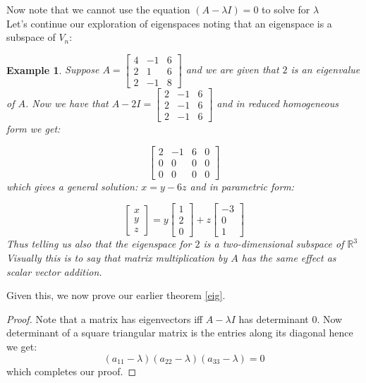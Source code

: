 \documentclass[titlepage]{article}
\newtheorem{exm}{Example}[subsection]
\numberwithin{equation}{subsection}
\begin{document}
Now note that we cannot use the equation $(A - \lambda I)=0$ to solve for $\lambda$
\\

Let's continue our exploration of eigenspaces noting that an eigenspace is a subspace of $V_{n}$:

\begin{exm}
Suppose $A = \begin{bmatrix}
    4 & -1 & 6\\
    2 & 1 & 6\\
    2 & -1 & 8 
\end{bmatrix}$ and we are given that $2$ is an eigenvalue of $A$. Now we have that $A - 2I = \begin{bmatrix}
    2 & -1 & 6\\
    2 & -1 & 6\\
    2 & -1 & 6 
\end{bmatrix}$ and in reduced homogeneous form we get:

$$  \begin{bmatrix}
    2 & -1 & 6 & 0\\
    0 & 0 & 0 & 0\\
     0 & 0 & 0 & 0
\end{bmatrix}$$ which gives a general solution: $x = y -6z$ and in parametric form: 

$$\begin{bmatrix}
    x\\
    y\\
    z
\end{bmatrix} = y\begin{bmatrix}
    1\\
    2\\
    0
\end{bmatrix} + z\begin{bmatrix}
    -3\\
    0\\
    1
\end{bmatrix}$$ Thus telling us also that the eigenspace for $2$ is a two-dimensional subspace of $\mathbb{R}^3$ Visually this is to say that matrix multiplication by $A$ has the same effect as scalar vector addition. 
\end{exm}

Given this, we now prove our earlier theorem \ref{eig}.
\begin{proof}
Note that a matrix has eigenvectors iff $A - \lambda I$ has determinant 0. Now determinant of a square triangular matrix is the entries along its diagonal hence we get:
$$(a_{11} - \lambda)(a_{22} - \lambda)(a_{33} - \lambda) = 0$$ which completes our proof.
\end{proof}
\\
\end{document}
